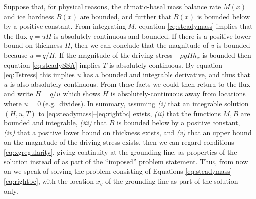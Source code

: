 \documentclass[twocolumn]{igs}
\begin{document}
Suppose that, for physical reasons, the climatic-basal mass balance rate $M(x)$ and ice hardness $B(x)$ are bounded, and further that $B(x)$ is bounded below by a positive constant.  From integrating $M$, equation \eqref{eq:steadymass} implies that the flux $q=uH$ is absolutely-continuous and bounded.  If there is a positive lower bound on thickness $H$, then we can conclude that the magnitude of $u$ is bounded because $u=q/H$.  If the magnitude of the driving stress $-\rho g H h_x$ is bounded then equation \eqref{eq:steadySSA} implies $T$ is absolutely-continuous.  By equation \eqref{eq:Tstress} this implies $u$ has a bounded and integrable derivative, and thus that $u$ is also absolutely-continuous.  From these facts we could then return to the flux and write $H=q/u$ which shows $H$ is absolutely-continuous away from locations where $u=0$ (e.g.~divides).  In summary, assuming \emph{(i)} that an integrable solution $(H,u,T)$ to \eqref{eq:steadymass}--\eqref{eq:rightbc} exists, \emph{(ii)} that the functions $M,B$ are bounded and integrable, \emph{(iii)} that $B$ is bounded below by a positive constant, \emph{(iv)} that a positive lower bound on thickness exists, and \emph{(v)} that an upper bound on the magnitude of the driving stress exists, then we can regard conditions \eqref{eq:xgregularity}, giving continuity at the grounding line, as properties of the solution instead of as part of the ``imposed'' problem statement.  Thus, from now on we speak of solving the problem consisting of Equations \eqref{eq:steadymass}--\eqref{eq:rightbc}, with the location $x_g$ of the grounding line as part of the solution only.
\end{document}
